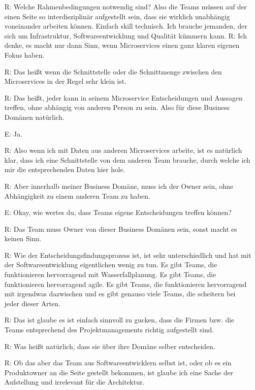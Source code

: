\label{appendix:r-16}
R: Welche Rahmenbedingungen notwendig sind? Also die Teams müssen auf der einen Seite so interdisziplinär aufgestellt sein, dass sie wirklich unabhängig voneinander arbeiten können. Einfach skill technisch. Ich brauche jemanden, der sich um Infrastruktur, Softwareentwicklung und Qualität kümmern kann.
\label{appendix:r-17}
R: Ich denke, es macht nur dann Sinn, wenn Microservices einen ganz klaren eigenen Fokus haben.

\label{appendix:r-18}
R: Das heißt wenn die Schnittstelle oder die Schnittmenge zwischen den Microservices in der Regel sehr klein ist.

\label{appendix:r-19}
R: Das heißt, jeder kann in seinem Microservice Entscheidungen und Aussagen treffen, ohne abhängig von anderen Person zu sein. Also für diese Business Domänen natürlich. 

E: Ja.

R: Also wenn ich mit Daten aus anderen Microservices arbeite, ist es natürlich klar, dass ich eine Schnittstelle von dem anderen Team brauche, durch welche ich mir die entsprechenden Daten hier hole.

\label{appendix:r-20}
R: Aber innerhalb meiner Business Domäne, muss ich der Owner sein, ohne Abhängigkeit zu einem anderen Team zu haben.

E: Okay, wie wertes du, dass Teams eigene Entscheidungen treffen können?

R: Das Team muss Owner von dieser Business Domänen sein, sonst macht es keinen Sinn.

\label{appendix:r-21}
R: Wie der Entscheidungsfindungsprozess ist, ist sehr unterschiedlich und hat mit der Softwareentwicklung eigentlichen wenig zu tun. Es gibt Teams, die funktionieren hervorragend mit Wasserfallplanung. Es gibt Teams, die funktionieren hervorragend agile. Es gibt Teams, die funktionieren hervorragend mit irgendwas dazwischen und es gibt genauso viele Teams, die scheitern bei jeder dieser Arten.

\label{appendix:r-22}
R: Das ist glaube es ist einfach sinnvoll zu gucken, dass die Firmen bzw. die Teams entsprechend des Projektmanagements richtig aufgestellt sind.

\label{appendix:r-23}
R: Was heißt natürlich, dass sie über ihre Domäne selber entscheiden.

\label{appendix:r-24}
R: Ob das aber das Team aus Softwareentwicklern selbst ist, oder ob es ein  Produktowner an die Seite gestellt bekommen, ist glaube ich eine Sache der Aufstellung und irrelevant für die Architektur.

